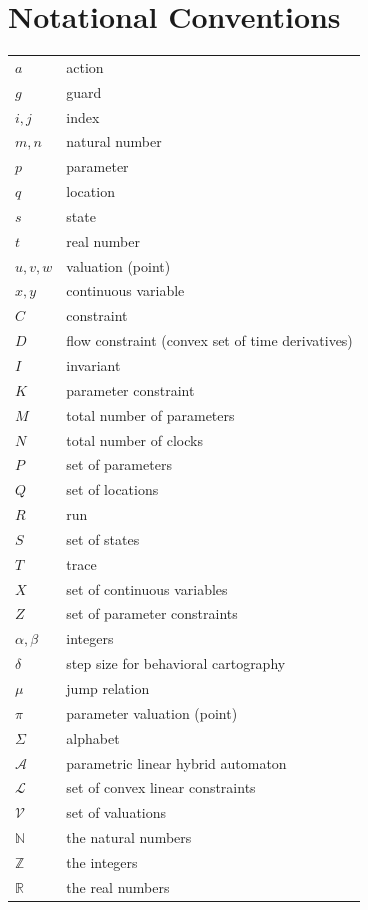 \documentclass{llncs}
\newcommand{\A}{\ensuremath{\mathcal{A}}}
\newcommand{\Reals}{\ensuremath{\mathbb{R}}}
\newcommand{\Naturals}{\ensuremath{\mathbb{N}}}
\newcommand{\Ints}{\ensuremath{\mathbb{Z}}}
\newcommand{\valuation}{\ensuremath{\mathcal{V}}}
\begin{document}


\section{Notational Conventions}

\begin{tabular}{ll}
  $a$ & action \\
  $g$ & guard \\
  $i,j$ & index \\
  $m,n$ & natural number \\
  $p$ & parameter \\
  $q$ & location \\
  $s$ & state \\
  $t$ & real number \\
  $u,v,w$ & valuation (point) \\
  $x,y$ & continuous variable \\
  
  $C$ & constraint \\
  $D$ & flow constraint (convex set of time derivatives) \\
  $I$ & invariant \\
  $K$ & parameter constraint \\
  $M$ & total number of parameters \\
  $N$ & total number of clocks \\  
  $P$ & set of parameters \\
  $Q$ & set of locations \\
  $R$ & run \\
  $S$ & set of states \\
  $T$ & trace \\
  $X$ & set of continuous variables \\
  $Z$ & set of parameter constraints \\

  $\alpha, \beta$ & integers \\
  $\delta$ & step size for behavioral cartography\\
  $\mu$ & jump relation \\
  $\pi$ & parameter valuation (point) \\
  $\Sigma$ & alphabet \\

  $\A$ & parametric linear hybrid automaton \\
  $\mathcal{L}$ & set of convex linear constraints \\
  $\valuation$ & set of valuations \\

  $\Naturals$ & the natural numbers \\
  $\Ints$ & the integers \\
  $\Reals$ & the real numbers
\end{tabular}
\end{document}
